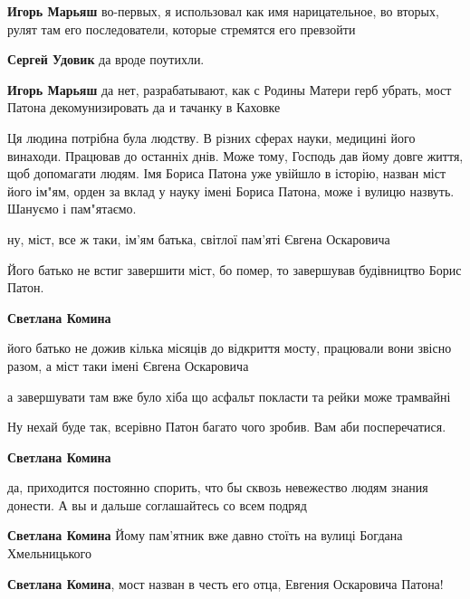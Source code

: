 \begin{itemize}
\begin{itemize}
\begin{itemize}
\textbf{Игорь Марьяш} во-первых, я использовал как имя нарицательное, во вторых, рулят там его последователи, которые стремятся его превзойти

\textbf{Сергей Удовик} да вроде поутихли.

\textbf{Игорь Марьяш} да нет, разрабатывают, как с Родины Матери герб убрать, мост Патона декомунизировать да и тачанку в Каховке
\end{itemize} %

\end{itemize} %


Ця людина потрібна була людству. В різних сферах науки, медицині його
винаходи. Працював до останніх днів. Може тому, Господь дав йому довге життя, щоб
допомагати людям. Імя Бориса Патона уже увійшло в історію, назван міст його
ім"ям, орден за вклад у науку імені Бориса Патона, може і вулицю
назвуть. Шануємо і пам"ятаємо.

\begin{itemize} %
ну, міст, все ж таки, ім'ям батька, світлої пам'яті Євгена Оскаровича

Його батько не встиг завершити міст, бо помер, то завершував будівництво Борис Патон.

\textbf{Светлана Комина} 

його батько не дожив кілька місяців до відкриття мосту, працювали вони звісно
разом, а міст таки імені Євгена Оскаровича

а завершувати там вже було хіба що асфальт покласти та рейки може трамвайні


Ну нехай буде так, всерівно Патон багато чого зробив. Вам аби посперечатися.

\textbf{Светлана Комина} 

да, приходится постоянно спорить, что бы сквозь невежество людям знания
донести. А вы и дальше соглашайтесь со всем подряд

\textbf{Светлана Комина} Йому пам'ятник вже давно стоїть на вулиці Богдана Хмельницького
\end{itemize} %

\textbf{Светлана Комина}, мост назван в честь его отца, Евгения Оскаровича Патона!



\end{itemize}
